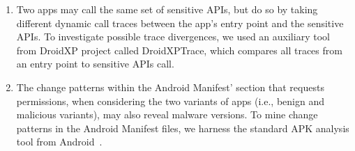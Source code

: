 \begin{enumerate}
    \item Two apps may call the same set of sensitive APIs, but do so by taking different dynamic call traces between the app's entry point and the sensitive APIs. To investigate possible trace divergences, we used an auxiliary tool from DroidXP project called DroidXPTrace, which compares all traces from an entry point to sensitive APIs call.
    \item The change patterns within the Android Manifest' section that requests permissions, when considering the two variants of apps (i.e., benign and malicious variants), may also reveal malware versions. To mine change patterns in the Android Manifest files, we harness the standard APK analysis tool from Android~\cite{au2011short}. 
\end{enumerate}


%

